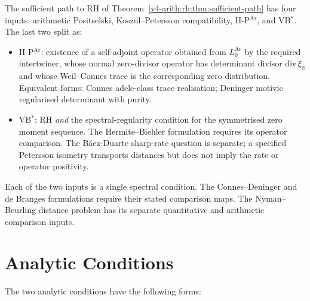 \begin{remark}
\label{v4-arith:hpvbconv:rem:refined-sufficient-path}
The sufficient path to RH of Theorem~\ref{v4-arith:rh:thm:sufficient-path}
has four inputs: arithmetic Positselski, Koszul--Petersson
compatibility, H-P\(^{\mathrm{Ar}}\), and VB\(^{*}\). The last two
split as:
\begin{itemize}
\item H-P\(^{\mathrm{Ar}}\): existence of a self-adjoint operator
obtained from \(L_{0}^{\mathrm{Ar}}\) by the required intertwiner, whose
normal zero-divisor operator has determinant divisor
\(\mathrm{div}\,\xi_{\mathbb R}\) and whose
Weil--Connes trace is the corresponding zero distribution. Equivalent
forms: Connes adele-class trace realisation; Deninger motivic
regularised determinant with purity.
\item VB\(^{*}\): RH \emph{and} the spectral-regularity condition for the
symmetrised zero moment sequence. The Hermite--Biehler formulation requires its operator comparison.
The B\'aez-Duarte sharp-rate question is separate; a specified
Petersson isometry transports distances but does not imply the rate
or operator positivity.
\end{itemize}
Each of the two inputs is a single spectral condition.  The Connes--Deninger and de Branges formulations require their
stated comparison maps. The Nyman--Beurling distance problem has
its separate quantitative and arithmetic comparison inputs.
\end{remark}

\section{Analytic Conditions}
\label{v4-arith:hpvbconv:residual}

The two analytic conditions have the following forms:

